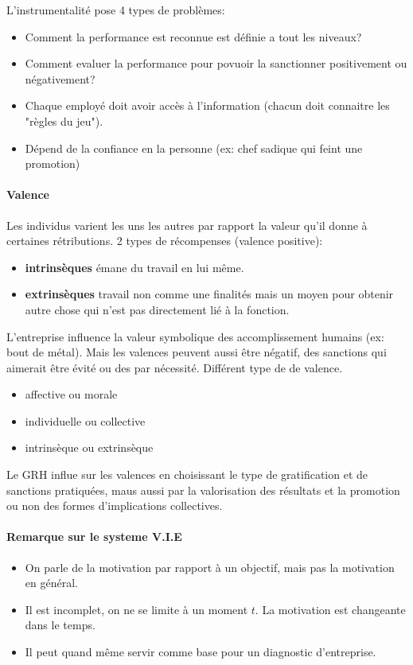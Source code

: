 \documentclass[11pt]{article} %
\begin{document}
L'instrumentalité pose 4 types de problèmes:
 \begin{itemize}
	\item Comment la performance est reconnue est définie a tout les niveaux? 
	\item Comment evaluer la performance pour povuoir la sanctionner positivement ou négativement?
	\item Chaque employé doit avoir accès à l'information (chacun doit connaitre les "règles du jeu").
	\item Dépend de la confiance en la personne (ex: chef sadique qui feint une promotion)
 \end{itemize}
 
 \paragraph{Valence} Les individus varient les uns les autres par rapport la valeur qu'il donne à 
 certaines rétributions. 2 types de récompenses (valence positive):
 \begin{itemize}
	\item \textbf{intrinsèques} émane du travail en lui même.
	\item \textbf{extrinsèques} travail non comme une finalités mais un moyen pour obtenir autre 
	chose qui n'est pas directement lié à la fonction.
 \end{itemize}
 L'entreprise influence la valeur symbolique des accomplissement humains (ex: bout de métal). Mais les
 valences peuvent aussi être négatif, des sanctions qui aimerait être évité ou des par nécessité. 
 Différent type de de valence.
 \begin{multicols}{2}
	\begin{itemize}
		\item affective ou morale
		\item individuelle ou collective
		\item intrinsèque ou extrinsèque
	\end{itemize}
 \end{multicols}
Le GRH influe sur les valences en choisissant le type de gratification et de sanctions pratiquées, maus aussi par la valorisation des résultats et la promotion ou non des formes d'implications collectives.

 \paragraph{Remarque sur le systeme V.I.E}
 \begin{itemize}
	\item On parle de la motivation par rapport à un objectif, mais pas la motivation en général.
	\item Il est incomplet, on ne se limite à un moment $t$. La motivation est changeante dans le temps.
	\item Il peut quand même servir comme base pour un diagnostic d'entreprise.
 \end{itemize}
\end{document}
